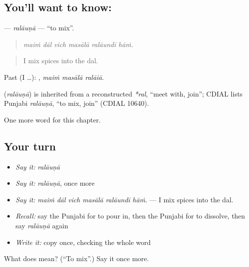 \subsection*{You'll want to know: }
\textbf{} — \emph{ralāuṇā} — \textquotedblleft{}to mix\textquotedblright{}.

\begin{quote}
     
\end{quote}

\begin{quote}
\emph{maiṁ dāl vich masālā ralāundī hāṁ.}
\end{quote}

\begin{quote}
I mix spices into the dal.
\end{quote}

Past (I …):   , \emph{maiṁ masālā ralāiā}.

\begin{cousinweb}
\textbf{} (\emph{ralāuṇā}) is inherited from a reconstructed \emph{*ral}, \textquotedblleft{}meet with, join\textquotedblright{}; CDIAL lists Punjabi \emph{ralāuṇā}, \textquotedblleft{}to mix, join\textquotedblright{} (CDIAL 10640).
\end{cousinweb}

\begin{grammarlens}[title={What you've built}]
One more word for this chapter.
\end{grammarlens}

\subsection*{Your turn}
\begin{itemize}
\raggedright
  \item \emph{Say it:} \emph{ralāuṇā}
  \item \emph{Say it:} \emph{ralāuṇā}, once more
  \item \emph{Say it:} \emph{maiṁ dāl vich masālā ralāundī hāṁ.} — I mix spices into the dal.
  \item \emph{Recall:} say the Punjabi for to pour in, then the Punjabi for to dissolve, then say \emph{ralāuṇā} again
  \item \emph{Write it:} copy \textbf{} once, checking the whole word
\end{itemize}

\begin{tcolorbox}[breakable,colback=teal!4,colframe=teal!35!black,title={Before you move on}]
What does  mean? (\textquotedblleft{}To mix\textquotedblright{}.) Say it once more.
\end{tcolorbox}
